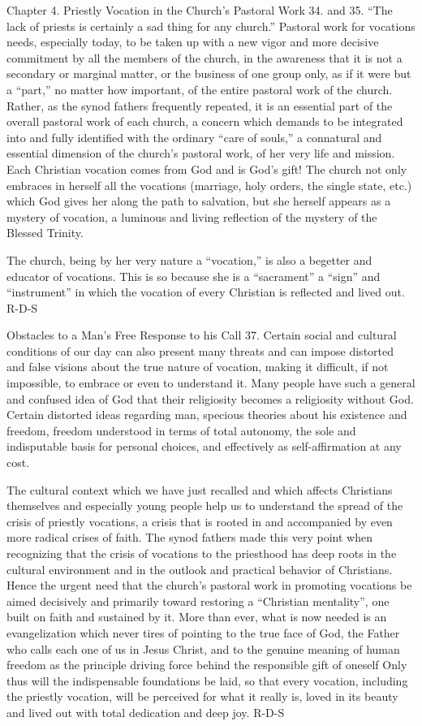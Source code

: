 \documentclass[oneside]{book}
\begin{document}
Chapter 4. Priestly Vocation in the Church's Pastoral Work
34. and 35. ``The lack of priests is certainly a sad thing for any church.''
Pastoral work for vocations needs, especially today, to be taken up with a new
vigor and more decisive commitment by all the members of the church, in the
awareness that it is not a secondary or marginal matter, or the business of one
group only, as if it were but a ``part,'' no matter how important, of the entire
pastoral work of the church. Rather, as the synod fathers frequently repeated,
it is an essential part of the overall pastoral work of each church, a concern
which demands to be integrated into and fully identified with the ordinary
``care of souls,'' a connatural and essential dimension of the church's pastoral
work, of her very life and mission.
Each Christian vocation comes from God and is God's gift! The church not only
embraces in herself all the vocations (marriage, holy orders, the single state,
etc.) which God gives her along the path to salvation, but she herself appears
as a mystery of vocation, a luminous and living reflection of the mystery of the
Blessed Trinity.

The church, being by her very nature a ``vocation,'' is also a begetter and
educator of vocations. This is so because she is a ``sacrament'' a ``sign'' and
``instrument'' in which the vocation of every Christian is reflected and lived
out.
R-D-S

Obstacles to a Man's Free Response to his Call
37. Certain social and cultural conditions of our day can also present many
threats and can impose distorted and false visions about the true nature of
vocation, making it difficult, if not impossible, to embrace or even to
understand it. Many people have such a general and confused idea of God that
their religiosity becomes a religiosity without God. Certain distorted ideas
regarding man, specious theories about his existence and freedom, freedom
understood in terms of total autonomy, the sole and indisputable basis for
personal choices, and effectively as self-affirmation at any cost.

The cultural context which we have just recalled and which affects Christians
themselves and especially young people help us to understand the spread of the
crisis of priestly vocations, a crisis that is rooted in and accompanied by even
more radical crises of faith. The synod fathers made this very point when
recognizing that the crisis of vocations to the priesthood has deep roots in the
cultural environment and in the outlook and practical behavior of Christians.
Hence the urgent need that the church's pastoral work in promoting vocations be
aimed decisively and primarily toward restoring a ``Christian mentality'', one
built on faith and sustained by it. More than ever, what is now needed is an
evangelization which never tires of pointing to the true face of God, the Father
who calls each one of us in Jesus Christ, and to the genuine meaning of human
freedom as the principle driving force behind the responsible gift of oneself
Only thus will the indispensable foundations be laid, so that every vocation,
including the priestly vocation, will be perceived for what it really is, loved
in its beauty and lived out with total dedication and deep joy.
R-D-S
\end{document}
